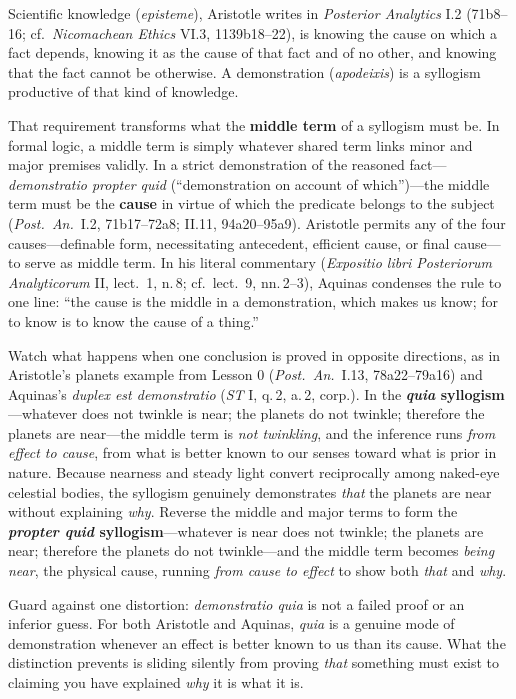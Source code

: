 Scientific knowledge (\emph{episteme}), Aristotle writes in \emph{Posterior Analytics} I.2 (71b8--16; cf.\ \emph{Nicomachean Ethics} VI.3, 1139b18--22), is knowing the cause on which a fact depends, knowing it as the cause of that fact and of no other, and knowing that the fact cannot be otherwise. A demonstration (\emph{apodeixis}) is a syllogism productive of that kind of knowledge.

That requirement transforms what the \textbf{middle term} of a syllogism must be. In formal logic, a middle term is simply whatever shared term links minor and major premises validly. In a strict demonstration of the reasoned fact---\emph{demonstratio propter quid} (``demonstration on account of which'')---the middle term must be the \textbf{cause} in virtue of which the predicate belongs to the subject (\emph{Post.\ An.}\ I.2, 71b17--72a8; II.11, 94a20--95a9). Aristotle permits any of the four causes---definable form, necessitating antecedent, efficient cause, or final cause---to serve as middle term. In his literal commentary (\emph{Expositio libri Posteriorum Analyticorum} II, lect.\ 1, n.\,8; cf.\ lect.\ 9, nn.\,2--3), Aquinas condenses the rule to one line: ``the cause is the middle in a demonstration, which makes us know; for to know is to know the cause of a thing.''

Watch what happens when one conclusion is proved in opposite directions, as in Aristotle's planets example from Lesson 0 (\emph{Post.\ An.}\ I.13, 78a22--79a16) and Aquinas's \emph{duplex est demonstratio} (\emph{ST} I, q.\,2, a.\,2, corp.). In the \textbf{\emph{quia} syllogism}---whatever does not twinkle is near; the planets do not twinkle; therefore the planets are near---the middle term is \emph{not twinkling}, and the inference runs \emph{from effect to cause}, from what is better known to our senses toward what is prior in nature. Because nearness and steady light convert reciprocally among naked-eye celestial bodies, the syllogism genuinely demonstrates \emph{that} the planets are near without explaining \emph{why}. Reverse the middle and major terms to form the \textbf{\emph{propter quid} syllogism}---whatever is near does not twinkle; the planets are near; therefore the planets do not twinkle---and the middle term becomes \emph{being near}, the physical cause, running \emph{from cause to effect} to show both \emph{that} and \emph{why}.

Guard against one distortion: \emph{demonstratio quia} is not a failed proof or an inferior guess. For both Aristotle and Aquinas, \emph{quia} is a genuine mode of demonstration whenever an effect is better known to us than its cause. What the distinction prevents is sliding silently from proving \emph{that} something must exist to claiming you have explained \emph{why} it is what it is.

